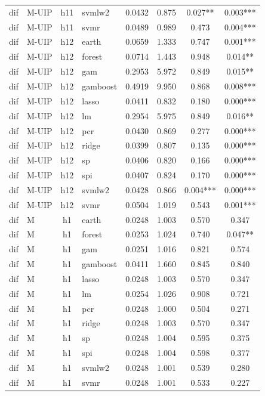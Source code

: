 \begin{ThreePartTable}
\begin{longtable}[t]{llclcccc}
dif & M-UIP & h11 & svmlw2 & 0.0432 & 0.875 & 0.027** & 0.003***\\
dif & M-UIP & h11 & svmr & 0.0489 & 0.989 & 0.473 & 0.004***\\
\addlinespace
dif & M-UIP & h12 & earth & 0.0659 & 1.333 & 0.747 & 0.001***\\
dif & M-UIP & h12 & forest & 0.0714 & 1.443 & 0.948 & 0.014**\\
dif & M-UIP & h12 & gam & 0.2953 & 5.972 & 0.849 & 0.015**\\
dif & M-UIP & h12 & gamboost & 0.4919 & 9.950 & 0.868 & 0.008***\\
dif & M-UIP & h12 & lasso & 0.0411 & 0.832 & 0.180 & 0.000***\\
dif & M-UIP & h12 & lm & 0.2954 & 5.975 & 0.849 & 0.016**\\
dif & M-UIP & h12 & pcr & 0.0430 & 0.869 & 0.277 & 0.000***\\
dif & M-UIP & h12 & ridge & 0.0399 & 0.807 & 0.135 & 0.000***\\
dif & M-UIP & h12 & sp & 0.0406 & 0.820 & 0.166 & 0.000***\\
dif & M-UIP & h12 & spi & 0.0407 & 0.824 & 0.170 & 0.000***\\
dif & M-UIP & h12 & svmlw2 & 0.0428 & 0.866 & 0.004*** & 0.000***\\
dif & M-UIP & h12 & svmr & 0.0504 & 1.019 & 0.543 & 0.001***\\
\addlinespace
dif & M & h1 & earth & 0.0248 & 1.003 & 0.570 & 0.347\\
dif & M & h1 & forest & 0.0253 & 1.024 & 0.740 & 0.047**\\
dif & M & h1 & gam & 0.0251 & 1.016 & 0.821 & 0.574\\
dif & M & h1 & gamboost & 0.0411 & 1.660 & 0.845 & 0.840\\
dif & M & h1 & lasso & 0.0248 & 1.003 & 0.570 & 0.347\\
dif & M & h1 & lm & 0.0254 & 1.026 & 0.908 & 0.721\\
dif & M & h1 & pcr & 0.0248 & 1.000 & 0.504 & 0.271\\
dif & M & h1 & ridge & 0.0248 & 1.003 & 0.570 & 0.347\\
dif & M & h1 & sp & 0.0248 & 1.004 & 0.595 & 0.375\\
dif & M & h1 & spi & 0.0248 & 1.004 & 0.598 & 0.377\\
dif & M & h1 & svmlw2 & 0.0248 & 1.001 & 0.539 & 0.280\\
dif & M & h1 & svmr & 0.0248 & 1.001 & 0.533 & 0.227\\

\end{longtable}
\end{ThreePartTable}
